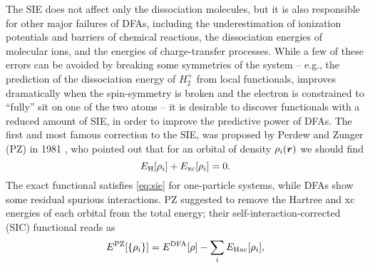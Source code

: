 The SIE does not affect only the dissociation molecules, but it is also responsible for other major failures of DFAs, including the underestimation of ionization potentials and barriers of chemical reactions, the dissociation energies of molecular ions, and the energies of charge-transfer processes. While a few of these errors can be avoided by breaking some symmetries of the system -- e.g., the prediction of the dissociation energy of $H_2^+$ from local functionals, improves dramatically when the spin-symmetry is broken and the electron is constrained to ``fully'' sit on one of the two atoms -- it is desirable to discover functionals with a reduced amount of SIE, in order to improve the predictive power of DFAs. The first and most famous correction to the SIE, was proposed by Perdew and Zunger (PZ) in 1981 \cite{perdew_self-interaction_1981}, who pointed out that for an orbital of density $\rho_i({\bm r})$ we should find
%
\begin{equation}
    E_{\rm H}[\rho_i] + E_{\rm xc}[\rho_i] = 0 .
    \label{eq:sie}
\end{equation}
%
The exact functional satisfies \cref{eq:sie} for one-particle systems, while DFAs show some residual spurious interactions. PZ suggested to remove the Hartree and xc energies of each orbital from the total energy; their self-interaction-corrected (SIC) functional reads as
%
\begin{equation}
    E^{\rm PZ}[\{ \rho_i \}] = E^{\rm DFA}[\rho] - \sum_i E_{\rm Hxc}[\rho_i] ,
    \label{eq:pz-functional}
\end{equation}
%
